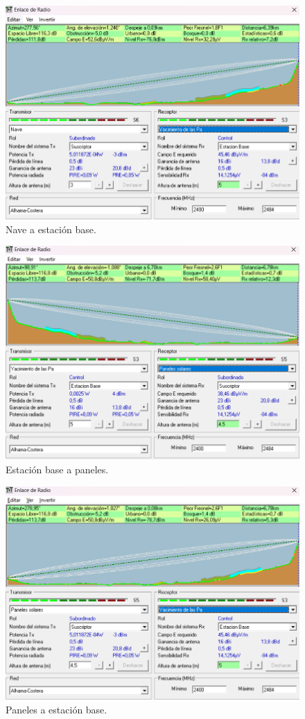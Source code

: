 \documentclass{article}
\begin{document}
\begin{figure}[ht]
    \centering
    \includegraphics[width=0.8\linewidth]{src/Nave-EstacionBase.png}
    \caption{\label{fig:naveebase} Nave a estación base.}
\end{figure}

\begin{figure}[ht]
    \centering
    \includegraphics[width=0.8\linewidth]{src/EstacionBase-Paneles.png}
    \caption{\label{fig:ebasepaneles} Estación base a paneles.}
\end{figure}

\newpage
\begin{figure}[ht]
    \centering
    \includegraphics[width=0.8\linewidth]{src/Paneles-EstacionBase.png}
    \caption{\label{fig:panelesebase} Paneles a estación base.}
\end{figure}
\end{document}
